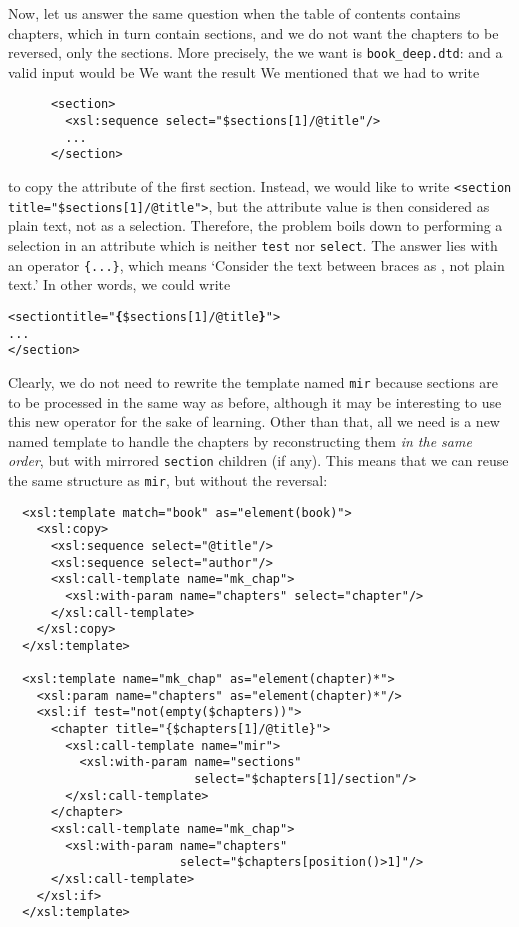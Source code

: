 Now, let us answer the same question when the table of contents
contains chapters, which in turn contain sections, and we do not want
the chapters to be reversed, only the sections. More precisely, the
\DTD we want is \texttt{book\_deep.dtd}:
\noindent and a valid input would be
\noindent We want the result
\noindent We mentioned that we had to write
\begin{verbatim}
      <section>
        <xsl:sequence select="$sections[1]/@title"/>
        ...
      </section>
\end{verbatim}
to copy the attribute of the first section. Instead, we would like to
write \texttt{<section title="\$sections[1]/@title">}, but the
attribute value is then considered as plain text, not as a
selection. Therefore, the problem boils down to performing a selection
in an attribute which is neither \texttt{test} nor
\texttt{select}. The answer lies with an \XPath operator
\texttt{\{...\}}, which means `Consider the text between braces as
\XPath, not plain text.' In other words, we could write
\begin{alltt}
      <section title="\textbf{\{}\$sections[1]/@title\textbf{\}}">
        ...
      </section>
\end{alltt}
Clearly, we do not need to rewrite the template named \texttt{mir}
because sections are to be processed in the same way as before,
although it may be interesting to use this new \XPath operator for the
sake of learning. Other than that, all we need is a new named template
to handle the chapters by reconstructing them \emph{in the same
  order}, but with mirrored \texttt{section} children (if any). This
means that we can reuse the same structure as \texttt{mir}, but
without the reversal:
\begin{verbatim}
  <xsl:template match="book" as="element(book)">
    <xsl:copy>
      <xsl:sequence select="@title"/>
      <xsl:sequence select="author"/>
      <xsl:call-template name="mk_chap">
        <xsl:with-param name="chapters" select="chapter"/>
      </xsl:call-template>
    </xsl:copy>
  </xsl:template>

  <xsl:template name="mk_chap" as="element(chapter)*">
    <xsl:param name="chapters" as="element(chapter)*"/>
    <xsl:if test="not(empty($chapters))">
      <chapter title="{$chapters[1]/@title}">
        <xsl:call-template name="mir">
          <xsl:with-param name="sections"
                          select="$chapters[1]/section"/>
        </xsl:call-template>
      </chapter>
      <xsl:call-template name="mk_chap">
        <xsl:with-param name="chapters"
                        select="$chapters[position()>1]"/>
      </xsl:call-template>
    </xsl:if>
  </xsl:template>
\end{verbatim}
